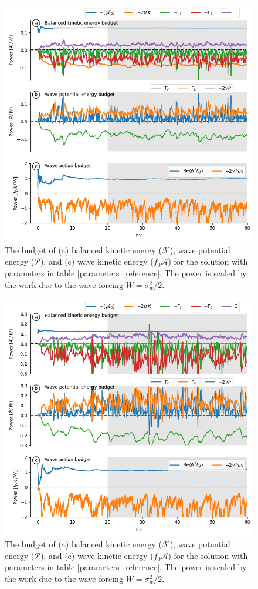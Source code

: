\documentclass[12pt]{article}
\newcommand{\A}{\mathscr{A}}
\newcommand{\K}{\mathscr{K}}
\renewcommand{\P}{\mathscr{P}}
\newcommand{\?}{\stackrel{?}{=}}
\begin{document}
\begin{figure}
\centering
\includegraphics[width=.825\textwidth]{figs/K_and_P_and_A_budget_reference.png}
\caption{The budget of (a) balanced kinetic energy ($\K$), wave potential energy ($\P$),
        and (c) wave kinetic energy ($f_0 \A$)  for the solution with parameters in table
         \ref{parameters_reference}. The power is scaled by the work due to the
         wave forcing $W=\sigma_w^2/2$.}
        \label{energy_budgets_reference}
\end{figure}
\begin{figure}
\centering
\includegraphics[width=.825\textwidth]{figs/K_and_P_and_A_budget_nodrag.png}
\caption{The budget of (a) balanced kinetic energy ($\K$), wave potential energy ($\P$),
        and (c) wave
         kinetic energy ($f_0 \A$)  for the solution with parameters in table
         \ref{parameters_reference}. The power is scaled by the work due to the
         wave forcing $W=\sigma_w^2/2$.}
        \label{energy_budgets_nodrag}
\end{figure}
\end{document}
